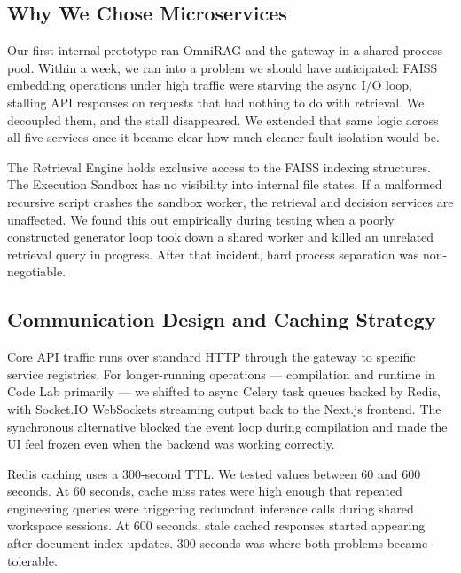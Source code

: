 \documentclass[conference]{IEEEtran}
\begin{document}
\subsection{Why We Chose Microservices}

Our first internal prototype ran OmniRAG and the gateway in a shared process pool. Within a week, we ran into a problem we should have anticipated: FAISS embedding operations under high traffic were starving the async I/O loop, stalling API responses on requests that had nothing to do with retrieval. We decoupled them, and the stall disappeared. We extended that same logic across all five services once it became clear how much cleaner fault isolation would be.

The Retrieval Engine holds exclusive access to the FAISS indexing structures. The Execution Sandbox has no visibility into internal file states. If a malformed recursive script crashes the sandbox worker, the retrieval and decision services are unaffected. We found this out empirically during testing when a poorly constructed generator loop took down a shared worker and killed an unrelated retrieval query in progress. After that incident, hard process separation was non-negotiable.

\subsection{Communication Design and Caching Strategy}

Core API traffic runs over standard HTTP through the gateway to specific service registries. For longer-running operations --- compilation and runtime in Code Lab primarily --- we shifted to async Celery task queues backed by Redis, with Socket.IO WebSockets streaming output back to the Next.js frontend. The synchronous alternative blocked the event loop during compilation and made the UI feel frozen even when the backend was working correctly.

Redis caching uses a 300-second TTL. We tested values between 60 and 600 seconds. At 60 seconds, cache miss rates were high enough that repeated engineering queries were triggering redundant inference calls during shared workspace sessions. At 600 seconds, stale cached responses started appearing after document index updates. 300 seconds was where both problems became tolerable.
\end{document}
